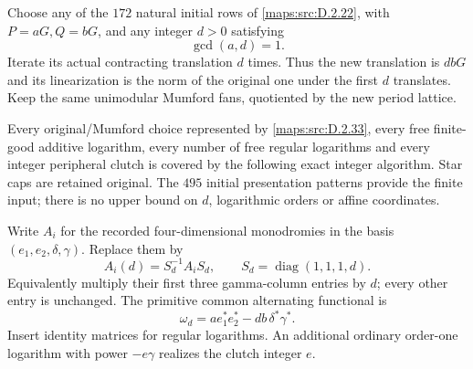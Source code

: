 \begin{theorem}\label{maps:src:D.2.37}


Choose any of the $172$ natural initial rows of \ref{maps:src:D.2.22},
with $P=aG,Q=bG$, and any integer $d>0$ satisfying
\[
                         \gcd(a,d)=1.                    \tag{D.WP1}\label{maps:eq:D.WP1}
\]
Iterate its actual contracting translation $d$ times.
Thus the new translation is $dbG$ and its linearization
is the norm of the original one under the first $d$
translates. Keep the same unimodular Mumford fans,
quotiented by the new period lattice.

Every original/Mumford choice represented by \ref{maps:src:D.2.33},
every free finite-good additive logarithm, every number
of free regular logarithms and every integer peripheral
clutch is covered by the following exact integer
algorithm. Star caps are retained original. The
$495$ initial presentation patterns provide the finite
input; there is no upper bound on $d$, logarithmic
orders or affine coordinates.

Write $A_i$ for the recorded four-dimensional
monodromies in the basis $(e_1,e_2,\delta,\gamma)$.
Replace them by
\[
 A_i(d)=S_d^{-1}A_iS_d,\qquad
 S_d=\operatorname{diag}(1,1,1,d).
                                                               \tag{D.WP2}\label{maps:eq:D.WP2}
\]
Equivalently multiply their first three gamma-column
entries by $d$; every other entry is unchanged.
The primitive common alternating functional is
\[
 \omega_d=a e_1^*e_2^*-db\,\delta^*\gamma^*.                \tag{D.WP3}\label{maps:eq:D.WP3}
\]
Insert identity matrices for regular logarithms.
An additional ordinary order-one logarithm with power
$-e\gamma$ realizes the clutch integer $e$.


\end{theorem}
